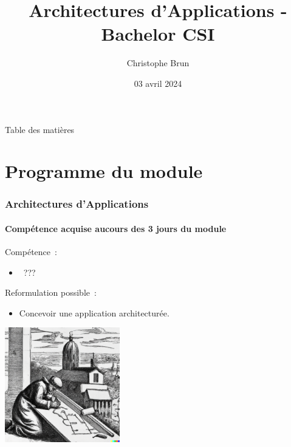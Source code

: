 \documentclass{beamer}
\title{Architectures d’Applications - Bachelor CSI}
\author{Christophe Brun}
\institute{Campus Saint-Michel IT}
\date{03 avril 2024}
\begin{document}
    \begin{frame}
        \transdissolve
        \titlepage
    \end{frame}

    \begin{frame}{Table des matières}
        \begin{tiny}
            \tableofcontents
        \end{tiny}
    \end{frame}


    \section{Programme du module}\label{sec:programme-du-module}
    \begin{frame}
        \frametitle{Architectures d’Applications}
        \framesubtitle{Compétence acquise aucours des 3 jours du module}
        \transdissolve
        Compétence~:
        \begin{itemize}
            \item {}~???
        \end{itemize}
        \pause
        \bigbreak
        Reformulation possible~:
        \begin{itemize}
            \item Concevoir une application architecturée.
        \end{itemize}
        \centering
        \includegraphics[width=5cm]{image/engraving-of-a-monk-drawing-a-cathedral}
    \end{frame}
\end{document}
